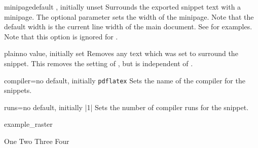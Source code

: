 

\begin{extTcbKey}[][doc new=2015-03-11]{minipage}{}{default \texttt{},
  initially unset}
Surrounds the exported snippet text with a minipage. The optional 
parameter sets the width of the minipage. Note that the default width is the
current line width of the main document.
See  for examples.
Note that this option is ignored for .
\end{extTcbKey}


\begin{extTcbKey}[][doc new=2015-03-11]{plain}{}{no value, initially set}
  Removes any text which was set to surround the snippet.
  This removes the setting of  , but is
  independent of .
\end{extTcbKey}


\begin{extTcbKey}[][doc new=2015-03-11]{compiler}{=}{no default,
  initially \texttt{pdflatex}}
  Sets the name of the compiler for the snippets.
\end{extTcbKey}

\begin{extTcbKey}[][doc new=2015-03-11]{runs}{=}{no default,
  initially |1|}
  Sets the number of compiler runs for the snippet.
\begin{dispExample}
\begin{tcbexternal}[minipage,runs=2]{example_raster}
  \begin{tcbitemize}[raster equal height,
      size=small,colframe=red!50!black,colback=red!10!white]
    \tcbitem One
    \tcbitem \Huge Two
    \tcbitem Three
    \tcbitem Four
  \end{tcbitemize}
\end{tcbexternal}
\end{dispExample}
\end{extTcbKey}


